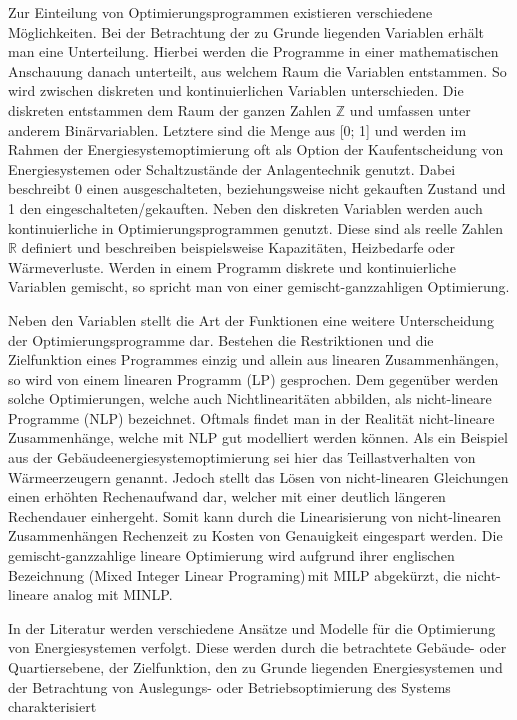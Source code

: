 Zur Einteilung von Optimierungsprogrammen existieren verschiedene Möglichkeiten.
Bei der Betrachtung der zu Grunde liegenden Variablen erhält man eine Unterteilung.
Hierbei werden die Programme in einer mathematischen Anschauung danach unterteilt, aus welchem Raum die Variablen entstammen.
So wird zwischen diskreten und kontinuierlichen Variablen unterschieden. 
Die diskreten entstammen dem Raum der ganzen Zahlen \(\mathbb{Z}\) und umfassen unter anderem Binärvariablen.
Letztere sind die Menge aus [0; 1] und werden im Rahmen der Energiesystemoptimierung oft als Option der Kaufentscheidung von Energiesystemen oder Schaltzustände der Anlagentechnik genutzt. 
Dabei beschreibt 0 einen ausgeschalteten, beziehungsweise nicht gekauften Zustand und 1 den eingeschalteten/gekauften.
Neben den diskreten Variablen werden auch kontinuierliche in Optimierungsprogrammen genutzt. 
Diese sind als reelle Zahlen \(\mathbb{R}\) definiert und beschreiben beispielsweise Kapazitäten, Heizbedarfe oder Wärmeverluste.
Werden in einem Programm diskrete und kontinuierliche Variablen gemischt, so spricht man von einer gemischt-ganzzahligen Optimierung. \cite{Schellong.2016}

Neben den Variablen stellt die Art der Funktionen eine weitere Unterscheidung der Optimierungsprogramme dar.
Bestehen die Restriktionen und die Zielfunktion eines Programmes einzig und allein aus linearen Zusammenhängen, so wird von einem linearen Programm (LP) gesprochen.
Dem gegenüber werden solche Optimierungen, welche auch Nichtlinearitäten abbilden, als nicht-lineare Programme (NLP) bezeichnet.
Oftmals findet man in der Realität nicht-lineare Zusammenhänge, welche mit NLP gut modelliert werden können.
Als ein Beispiel aus der Gebäudeenergiesystemoptimierung sei hier das Teillastverhalten von Wärmeerzeugern genannt.
Jedoch stellt das Lösen von nicht-linearen Gleichungen einen erhöhten Rechenaufwand dar, welcher mit einer deutlich längeren Rechendauer einhergeht.
Somit kann durch die Linearisierung von nicht-linearen Zusammenhängen Rechenzeit zu Kosten von Genauigkeit eingespart werden. 
Die gemischt-ganzzahlige lineare Optimierung wird aufgrund ihrer englischen Bezeichnung (\glqq Mixed Integer Linear Programing\grqq)\,mit MILP abgekürzt, die nicht-lineare analog mit MINLP. \cite{Samsatli.2018} 

In der Literatur werden verschiedene Ansätze und Modelle für die Optimierung von Energiesystemen verfolgt.
Diese werden durch die betrachtete Gebäude- oder Quartiersebene, der Zielfunktion, den zu Grunde liegenden Energiesystemen und der Betrachtung von Auslegungs- oder Betriebsoptimierung des Systems charakterisiert


